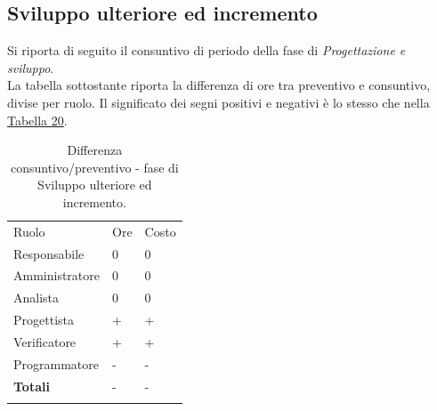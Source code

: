 \documentclass[a4paper]{article}
\begin{document}
			\subsection{Sviluppo ulteriore ed incremento}
                Si riporta di seguito il consuntivo di periodo della fase di \emph{Progettazione e sviluppo}. \\
                La tabella sottostante riporta la differenza di ore tra preventivo e consuntivo, divise per ruolo. Il significato dei segni
                positivi e negativi è lo stesso che nella \hyperref[DCSceltaCapitolato]{Tabella 20}.
                \begin{table}[H]
					\begin{tabularx}{\textwidth}{Y Y Y}
						Ruolo & Ore & Costo \\
						Responsabile & 0 & 0 \\
						Amministratore & 0 & 0 \\
						Analista & 0 & 0 \\
						Progettista & + & + \\
						Verificatore & + & + \\
						Programmatore & - & - \\
						\textbf{Totali} & - & - \\
					\end{tabularx}
					\caption{Differenza consuntivo/preventivo - fase di Sviluppo ulteriore ed incremento. } 
					\label{ConsuntivoIncremento}
				\end{table}
				
\end{document}
